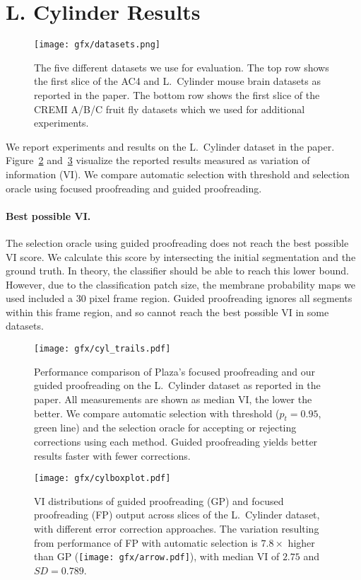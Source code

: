 \section{L. Cylinder Results}

\begin{figure}[t]
\centering
\texttt{[image: gfx/datasets.png]}
\caption{The five different datasets we use for evaluation. The top row shows the first slice of the AC4 and L.~Cylinder mouse brain datasets as reported in the paper. The bottom row shows the first slice of the CREMI A/B/C fruit fly datasets which we used for additional experiments.}
\label{fig:datasets}
\end{figure}

We report experiments and results on the L.~Cylinder dataset in the paper. Figure~\ref{fig:cyltrails} and~\ref{fig:cylboxplot} visualize the reported results measured as variation of information (VI). We compare automatic selection with threshold and selection oracle using focused proofreading and guided proofreading.

\paragraph{Best possible VI.} The selection oracle using guided proofreading does not reach the best possible VI score. We calculate this score by intersecting the initial segmentation and the ground truth. In theory, the classifier should be able to reach this lower bound. However, due to the classification patch size, the membrane probability maps we used included a 30 pixel frame region. Guided proofreading ignores all segments within this frame region, and so cannot reach the best possible VI in some datasets.

\begin{figure}[t]
\centering
\texttt{[image: gfx/cyl\_trails.pdf]}
\caption{Performance comparison of Plaza's focused proofreading and our guided proofreading on the L.~Cylinder dataset as reported in the paper. All measurements are shown as median VI, the lower the better. We compare automatic selection with threshold ($p_t=0.95$, green line) and the selection oracle for accepting or rejecting corrections using each method. Guided proofreading yields better results faster with fewer corrections.}
\label{fig:cyltrails}
\end{figure}

\begin{figure}[t]
\centering
\texttt{[image: gfx/cylboxplot.pdf]}
\caption{VI distributions of guided proofreading (GP) and focused proofreading (FP) output across slices of the L.~Cylinder dataset, with different error correction approaches. The variation resulting from performance of FP with automatic selection is $7.8\times$ higher than GP (\protect\texttt{[image: gfx/arrow.pdf]}), with median VI of $2.75$ and $SD=0.789$.}
\label{fig:cylboxplot}
\end{figure}

